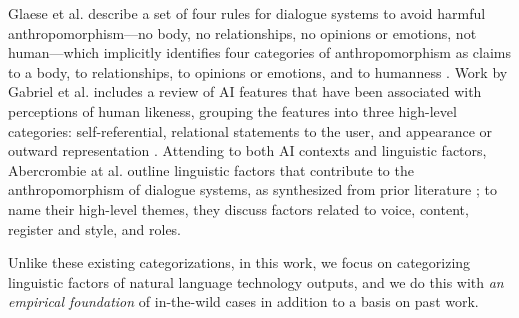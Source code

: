 Glaese et al. describe a set of four rules for dialogue systems to avoid harmful anthropomorphism---no body, no relationships, no opinions or emotions, not human---which implicitly identifies four categories of anthropomorphism as claims to a body, to relationships, to opinions or emotions, and to humanness \cite{glaese2022improving}. Work by Gabriel et al. includes a review of AI features that have been associated with perceptions of human likeness, grouping the features into three high-level categories: self-referential, relational statements to the user, and appearance or outward representation \cite{gabriel2024ethics}. 
Attending to both AI contexts and linguistic factors, Abercrombie at al. outline linguistic factors that contribute to the anthropomorphism of dialogue systems, as synthesized from prior literature \cite{abercrombie2023mirages}; to name their high-level themes, they discuss factors related to voice, content, register and style, and roles. 

Unlike these existing categorizations, in this work, we focus on categorizing linguistic factors of natural language technology outputs, and we do this with \textit{an empirical foundation} of in-the-wild cases in addition to a basis on past work.